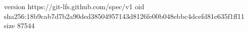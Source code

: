 version https://git-lfs.github.com/spec/v1
oid sha256:18b9cab7d7b2a90ded38504957143d8126fe00b048ebbc4dcefd81e635f1ff11
size 87544
